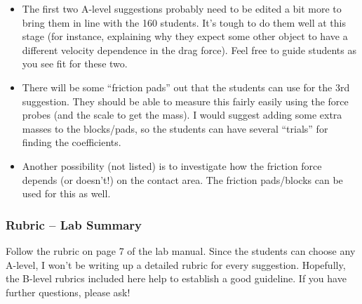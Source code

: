 \documentclass[fleqn,letterpaper]{article}
\begin{document}
\begin{itemize}
 \item{The first two A-level suggestions probably need to be edited a bit more to bring them in line with the 160 students.  It's tough to do them well at this stage (for instance, explaining why they expect some other object to have a different velocity dependence in the drag force).  Feel free to guide students as you see fit for these two.}
 \item{There will be some ``friction pads'' out that the students can use for the 3rd suggestion.  They should be able to measure this fairly easily using the force probes (and the scale to get the mass).  I would suggest adding some extra masses to the blocks/pads, so the students can have several ``trials'' for finding the coefficients.}
 \item{Another possibility (not listed) is to investigate how the friction force depends (or doesn't!) on the contact area.  The friction pads/blocks can be used for this as well.}
\end{itemize}

\subsubsection*{Rubric -- Lab Summary}

Follow the rubric on page 7 of the lab manual.  Since the students can choose any A-level, I won't be writing up a detailed rubric for every suggestion.  Hopefully, the B-level rubrics included here help to establish a good guideline.  If you have further questions, please ask!

\label{LastPage}
\end{document}
